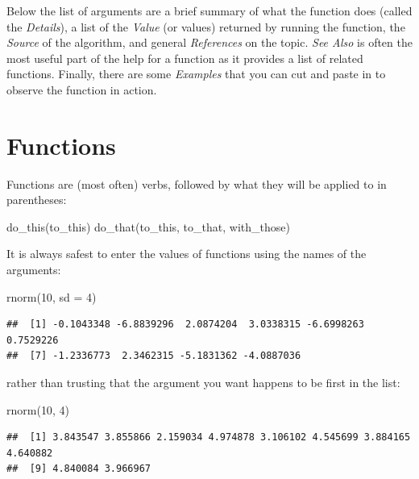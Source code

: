 \documentclass[
]{book}
\newenvironment{Shaded}{\begin{snugshade}}{\end{snugshade}}
\newcommand{\AttributeTok}[1]{\textcolor[rgb]{0.77,0.63,0.00}{#1}}
\newcommand{\DecValTok}[1]{\textcolor[rgb]{0.00,0.00,0.81}{#1}}
\newcommand{\FunctionTok}[1]{\textcolor[rgb]{0.00,0.00,0.00}{#1}}
\newcommand{\NormalTok}[1]{#1}
\begin{document}
Below the list of arguments are a brief summary of what the function does (called the \emph{Details}), a list of the \emph{Value} (or values) returned by running the function, the \emph{Source} of the algorithm, and general \emph{References} on the topic. \emph{See Also} is often the most useful part of the help for a function as it provides a list of related functions. Finally, there are some \emph{Examples} that you can cut and paste in to observe the function in action.

\hypertarget{functions}{%
\section{Functions}\label{functions}}

Functions are (most often) verbs, followed by what they will be applied to in parentheses:

\begin{Shaded}
\begin{Highlighting}[]
\FunctionTok{do\_this}\NormalTok{(to\_this)}
\FunctionTok{do\_that}\NormalTok{(to\_this, to\_that, with\_those)}
\end{Highlighting}
\end{Shaded}

It is always safest to enter the values of functions using the names of the arguments:

\begin{Shaded}
\begin{Highlighting}[]
\FunctionTok{rnorm}\NormalTok{(}\DecValTok{10}\NormalTok{, }\AttributeTok{sd =} \DecValTok{4}\NormalTok{)}
\end{Highlighting}
\end{Shaded}

\begin{verbatim}
##  [1] -0.1043348 -6.8839296  2.0874204  3.0338315 -6.6998263  0.7529226
##  [7] -1.2336773  2.3462315 -5.1831362 -4.0887036
\end{verbatim}

rather than trusting that the argument you want happens to be first in the list:

\begin{Shaded}
\begin{Highlighting}[]
\FunctionTok{rnorm}\NormalTok{(}\DecValTok{10}\NormalTok{, }\DecValTok{4}\NormalTok{)}
\end{Highlighting}
\end{Shaded}

\begin{verbatim}
##  [1] 3.843547 3.855866 2.159034 4.974878 3.106102 4.545699 3.884165 4.640882
##  [9] 4.840084 3.966967
\end{verbatim}
\end{document}
